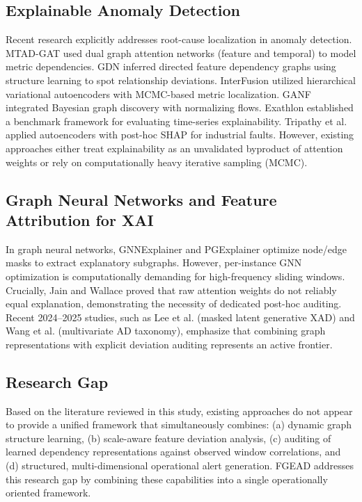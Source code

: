 \documentclass[conference]{IEEEtran}
\begin{document}
\subsection{Explainable Anomaly Detection}
Recent research explicitly addresses root-cause localization in anomaly detection. MTAD-GAT \cite{zhao2020multivariate} used dual graph attention networks (feature and temporal) to model metric dependencies. GDN \cite{deng2021graph} inferred directed feature dependency graphs using structure learning to spot relationship deviations. InterFusion \cite{li2021multivariate} utilized hierarchical variational autoencoders with MCMC-based metric localization. GANF \cite{dai2022graph} integrated Bayesian graph discovery with normalizing flows. Exathlon \cite{jacob2021exathlon} established a benchmark framework for evaluating time-series explainability. Tripathy et al. \cite{tripathy2022explaining} applied autoencoders with post-hoc SHAP for industrial faults. However, existing approaches either treat explainability as an unvalidated byproduct of attention weights or rely on computationally heavy iterative sampling (MCMC).

\subsection{Graph Neural Networks and Feature Attribution for XAI}
In graph neural networks, GNNExplainer \cite{ying2019gnnexplainer} and PGExplainer \cite{luo2020parameterized} optimize node/edge masks to extract explanatory subgraphs. However, per-instance GNN optimization is computationally demanding for high-frequency sliding windows. Crucially, Jain and Wallace \cite{jain2019attention} proved that raw attention weights do not reliably equal explanation, demonstrating the necessity of dedicated post-hoc auditing. Recent 2024–2025 studies, such as Lee et al. \cite{lee2024explainable} (masked latent generative XAD) and Wang et al. \cite{wang2025survey} (multivariate AD taxonomy), emphasize that combining graph representations with explicit deviation auditing represents an active frontier.

\subsection{Research Gap}
Based on the literature reviewed in this study, existing approaches do not appear to provide a unified framework that simultaneously combines: (a) dynamic graph structure learning, (b) scale-aware feature deviation analysis, (c) auditing of learned dependency representations against observed window correlations, and (d) structured, multi-dimensional operational alert generation. FGEAD addresses this research gap by combining these capabilities into a single operationally oriented framework.
\end{document}
